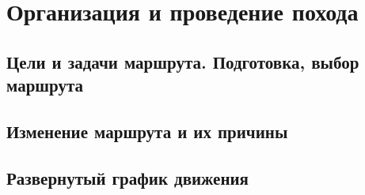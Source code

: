 \section{Организация и проведение похода}
\subsection{Цели и задачи маршрута. Подготовка, выбор маршрута}
\subsection{Изменение маршрута и их причины}
\subsection{Развернутый график движения}
\newpage